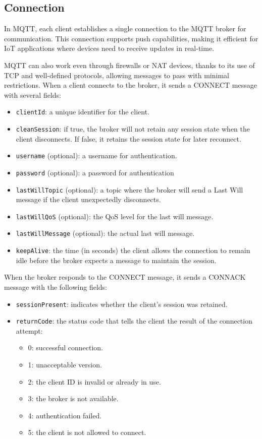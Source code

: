 \subsection{Connection}
In MQTT, each client establishes a single connection to the MQTT broker for communication. 
This connection supports push capabilities, making it efficient for IoT applications where devices need to receive updates in real-time.

MQTT can also work even through firewalls or NAT devices, thanks to its use of TCP and well-defined protocols, allowing messages to pass with minimal restrictions.
When a client connects to the broker, it sends a CONNECT message with several fields:
\begin{itemize}
    \item \texttt{clientId}: a unique identifier for the client.
    \item \texttt{cleanSession}: if true, the broker will not retain any session state when the client disconnects. 
        If false, it retains the session state for later reconnect.
    \item \texttt{username} (optional): a username for authentication.
    \item \texttt{password} (optional): a password for authentication
    \item \texttt{lastWillTopic} (optional): a topic where the broker will send a Last Will message if the client unexpectedly disconnects.
    \item \texttt{lastWillQoS} (optional): the QoS level for the last will message.
    \item \texttt{lastWillMessage} (optional): the actual last will message.
    \item \texttt{keepAlive}: the time (in seconds) the client allows the connection to remain idle before the broker expects a message to maintain the session.
\end{itemize}
\noindent
When the broker responds to the CONNECT message, it sends a CONNACK message with the following fields:
\begin{itemize}
    \item \texttt{sessionPresent}: indicates whether the client's session was retained.
    \item \texttt{returnCode}: the status code that tells the client the result of the connection attempt:
        \begin{itemize}
            \item 0: successful connection.
            \item 1: unacceptable version.
            \item 2: the client ID is invalid or already in use.
            \item 3: the broker is not available.
            \item 4: authentication failed.
            \item 5: the client is not allowed to connect.
        \end{itemize}
\end{itemize}

